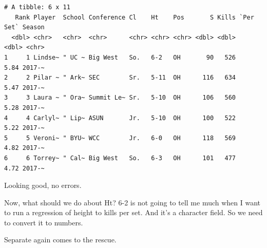 \documentclass[
  letterpaper,
  DIV=11,
  numbers=noendperiod]{scrreprt}
\begin{document}
\begin{verbatim}
# A tibble: 6 x 11
   Rank Player  School Conference Cl    Ht    Pos       S Kills `Per Set` Season
  <dbl> <chr>   <chr>  <chr>      <chr> <chr> <chr> <dbl> <dbl>     <dbl> <chr> 
1     1 Lindse~ " UC ~ Big West   So.   6-2   OH       90   526      5.84 2017-~
2     2 Pilar ~ " Ark~ SEC        Sr.   5-11  OH      116   634      5.47 2017-~
3     3 Laura ~ " Ora~ Summit Le~ Sr.   5-10  OH      106   560      5.28 2017-~
4     4 Carlyl~ " Lip~ ASUN       Jr.   5-10  OH      100   522      5.22 2017-~
5     5 Veroni~ " BYU~ WCC        Jr.   6-0   OH      118   569      4.82 2017-~
6     6 Torrey~ " Cal~ Big West   So.   6-3   OH      101   477      4.72 2017-~
\end{verbatim}

Looking good, no errors.

Now, what should we do about Ht? 6-2 is not going to tell me much when I
want to run a regression of height to kills per set. And it's a
character field. So we need to convert it to numbers.

Separate again comes to the rescue.
\end{document}
